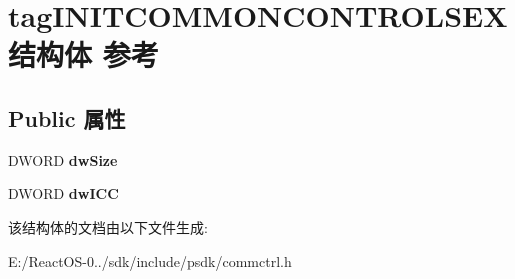 \hypertarget{structtag_i_n_i_t_c_o_m_m_o_n_c_o_n_t_r_o_l_s_e_x}{}\section{tag\+I\+N\+I\+T\+C\+O\+M\+M\+O\+N\+C\+O\+N\+T\+R\+O\+L\+S\+E\+X结构体 参考}
\label{structtag_i_n_i_t_c_o_m_m_o_n_c_o_n_t_r_o_l_s_e_x}
\subsection*{Public 属性}
\begin{DoxyCompactItemize}
\item 
\mbox{\label{structtag_i_n_i_t_c_o_m_m_o_n_c_o_n_t_r_o_l_s_e_x_ad7e30dcd7470cd5f952a1c2822806bf2}} 
D\+W\+O\+RD {\bfseries dw\+Size}
\item 
\mbox{\label{structtag_i_n_i_t_c_o_m_m_o_n_c_o_n_t_r_o_l_s_e_x_ac63cccbf582527ed725b598ae96bda96}} 
D\+W\+O\+RD {\bfseries dw\+I\+CC}
\end{DoxyCompactItemize}


该结构体的文档由以下文件生成\+:\begin{DoxyCompactItemize}
\item 
E\+:/\+React\+O\+S-\/0../sdk/include/psdk/commctrl.\+h\end{DoxyCompactItemize}
